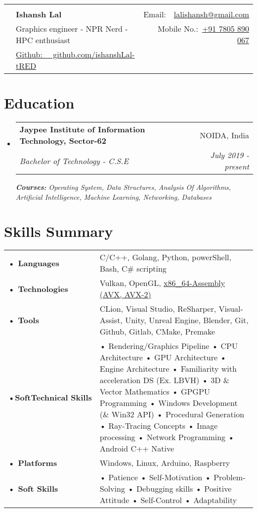 \documentclass[a4paper,10pt]{article}
\makeatletter
\newcommand{\resumeSubheading}[4]{
  \vspace{-1pt}\item
    \begin{tabular*}{0.97\textwidth}{l@{\extracolsep{\fill}}r}
      \textbf{#1} & #2 \\
      \textit{#3} & \textit{#4} \\
    \end{tabular*}\vspace{-5pt}
}
\newcommand{\resumeSubHeadingListStart}{\begin{itemize}[leftmargin=*]}
\newcommand{\resumeSubHeadingListEnd}{\end{itemize}}
\newcommand{\photo}[1]{\begin{tikzpicture}\clip (0,0) circle (1.1cm) node {\texttt{[image: \#1]}};\end{tikzpicture}}
\makeatother
\begin{document}
\begin{tabular*}{\textwidth}{c l@{\extracolsep{\fill}}r}
  \multirow{4}{*}{\photo{../me-cropped}} \\
   & \textbf{{\LARGE Ishansh Lal}} & Email:~~\href{mailto:lalishansh@gmail.com}{lalishansh@gmail.com}\\
   & Graphics engineer - NPR Nerd - HPC enthusiast & Mobile No.:~\href{tel:917805890067}{+91 7805 890 067}\\
   & \href{https://github.com/ishanshLal-tRED}{Github: ~~github.com/ishanshLal-tRED} \\
\end{tabular*}
\section{Education}
  \resumeSubHeadingListStart
    \resumeSubheading
      {Jaypee Institute of Information Technology, Sector-62}{NOIDA, India}
      {Bachelor of Technology - C.S.E}{July 2019 - present}
      {\scriptsize \textit{ \footnotesize{\newline{}\textbf{Courses:} Operating System, Data Structures, Analysis Of Algorithms, Artificial Intelligence, Machine Learning, Networking, Databases}}}\\
    \resumeSubHeadingListEnd
\vspace{-6pt}
\section{Skills Summary}
\begin{tabular}{p{}p{}}
    \textbf{• Languages}&{C/C++, Golang, Python, powerShell, Bash, C\# scripting}\\
    \textbf{• Technologies}&{Vulkan, OpenGL, \url{x86_64-Assembly (AVX, AVX-2)}}\\
    \textbf{• Tools}&{CLion, Visual Studio, ReSharper, Visual-Assist, Unity, Unreal Engine, Blender, Git, Github, Gitlab, CMake, Premake}\\
    \textbf{•\hspace{5pt}SoftTechnical\hspace{15pt}\textcolor{white}{!}\hspace{7pt}Skills}&{• Rendering/Graphics Pipeline • CPU Architecture • GPU Architecture • Engine Architecture • Familiarity with acceleration DS (Ex. LBVH) • 3D \& Vector Mathematics • GPGPU Programming • Windows Development (\& Win32 API) • Procedural Generation • Ray-Tracing Concepts • Image processing • Network Programming • Android C++ Native}\\
    \textbf{• Platforms}&{Windows, Linux, Arduino, Raspberry}\\
    \textbf{• Soft Skills}&{• Patience • Self-Motivation • Problem-Solving • Debugging skills • Positive Attitude • Self-Control • Adaptability}
\end{tabular}
\vspace{-2pt}
\end{document}
